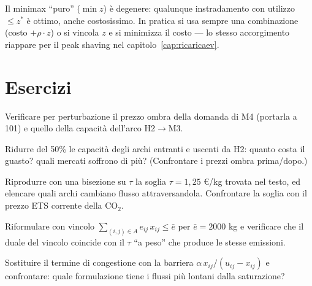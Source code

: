 \begin{attenzione}
Il minimax ``puro'' ($\min z$) è degenere: qualunque instradamento con utilizzo
$\le z^*$ è ottimo, anche costosissimo. In pratica si usa sempre una combinazione
(costo $+ \rho \cdot z$) o si vincola $z$ e si minimizza il costo --- lo stesso
accorgimento riappare per il peak shaving nel capitolo~\ref{cap:ricaricaev}.
\end{attenzione}

\section{Esercizi}

\begin{esercizio}[verifica]
Verificare per perturbazione il prezzo ombra della domanda di M4 (portarla a 101) e
quello della capacità dell'arco H2$\to$M3.
\end{esercizio}

\begin{esercizio}
Ridurre del 50\% le capacità degli archi entranti e uscenti da H2: quanto costa il
guasto? quali mercati soffrono di più? (Confrontare i prezzi ombra prima/dopo.)
\end{esercizio}

\begin{esercizio}
Riprodurre con una bisezione su $\tau$ la soglia $\tau = 1{,}25$ \euro/kg trovata nel
testo, ed elencare quali archi cambiano flusso attraversandola. Confrontare la soglia
con il prezzo ETS corrente della CO$_2$.
\end{esercizio}

\begin{esercizio}
Riformulare con vincolo $\sum_{(i,j) \in A} e_{ij}\, x_{ij} \le \bar e$ per $\bar e = 2000$ kg e verificare che
il duale del vincolo coincide con il $\tau$ ``a peso'' che produce le stesse emissioni.
\end{esercizio}

\begin{esercizio}[barriera]
Sostituire il termine di congestione con la barriera
$\alpha\, x_{ij}/(u_{ij} - x_{ij})$ e confrontare: quale formulazione tiene i flussi
più lontani dalla saturazione?
\end{esercizio}
